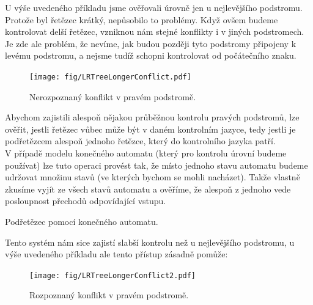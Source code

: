 U výše uvedeného příkladu jsme ověřovali úrovně jen u nejlevějšího
podstromu. Protože byl řetězec krátký, nepůsobilo to problémy.
Když ovšem budeme kontrolovat delší řetězec, vzniknou nám stejné konflikty
i v jiných podstromech. Je zde ale problém, že nevíme, jak budou později
tyto podstromy připojeny k levému podstromu, a nejsme tudíž schopni
kontrolovat od počátečního znaku.\\

\begin{figure}[H]
  \centering
  \texttt{[image: fig/LRTreeLongerConflict.pdf]}
  \caption{Nerozpoznaný konflikt v pravém podstromě.}
\end{figure}

Abychom zajistili alespoň nějakou průběžnou kontrolu pravých podstromů,
lze ověřit, jestli řetězec vůbec může být v daném kontrolním
jazyce, tedy jestli je podřetězcem alespoň jednoho řetězce, který do kontrolního
jazyka patří.\\

V případě modelu konečného automatu (který pro kontrolu úrovní budeme používat)
lze tuto operaci provést tak, že místo jednoho stavu automatu budeme udržovat
množinu stavů (ve kterých bychom se mohli nacházet). Takže vlastně zkusíme
vyjít ze všech stavů automatu a ověříme, že alespoň z jednoho
vede posloupnost přechodů odpovídající vstupu.\\

\begin{algorithm}[H]
  \caption{Podřetězec pomocí konečného automatu.}
  \label{alg:substr}

  \BlankLine
\end{algorithm}
\vspace{0.5cm}

Tento systém nám sice zajistí slabší kontrolu než u nejlevějšího podstromu,
u výše uvedeného příkladu ale tento přístup zásadně pomůže:

\begin{figure}[H]
  \centering
  \texttt{[image: fig/LRTreeLongerConflict2.pdf]}
  \caption{Rozpoznaný konflikt v pravém podstromě.}
\end{figure}

